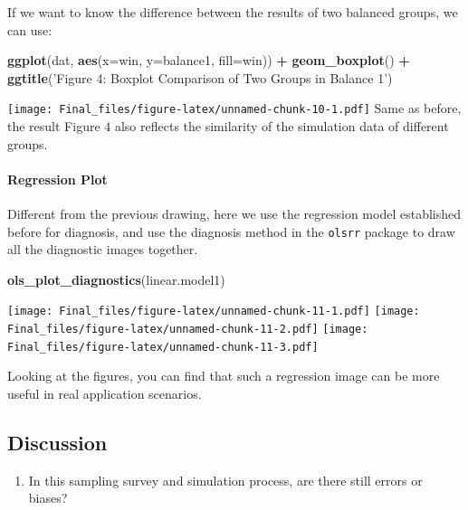 \documentclass[
]{article}
\newenvironment{Shaded}{\begin{snugshade}}{\end{snugshade}}
\newcommand{\DataTypeTok}[1]{\textcolor[rgb]{0.13,0.29,0.53}{#1}}
\newcommand{\KeywordTok}[1]{\textcolor[rgb]{0.13,0.29,0.53}{\textbf{#1}}}
\newcommand{\NormalTok}[1]{#1}
\newcommand{\OperatorTok}[1]{\textcolor[rgb]{0.81,0.36,0.00}{\textbf{#1}}}
\newcommand{\StringTok}[1]{\textcolor[rgb]{0.31,0.60,0.02}{#1}}
\providecommand{\tightlist}{%
  \setlength{\itemsep}{0pt}\setlength{\parskip}{0pt}}
\begin{document}
If we want to know the difference between the results of two balanced
groups, we can use:

\begin{Shaded}
\begin{Highlighting}[]
\KeywordTok{ggplot}\NormalTok{(dat, }\KeywordTok{aes}\NormalTok{(}\DataTypeTok{x=}\NormalTok{win, }\DataTypeTok{y=}\NormalTok{balance1, }\DataTypeTok{fill=}\NormalTok{win)) }\OperatorTok{+}
\StringTok{  }\KeywordTok{geom_boxplot}\NormalTok{() }\OperatorTok{+}
\StringTok{  }\KeywordTok{ggtitle}\NormalTok{(}\StringTok{'Figure 4: Boxplot Comparison of Two Groups in Balance 1'}\NormalTok{)}
\end{Highlighting}
\end{Shaded}

\texttt{[image: Final\_files/figure-latex/unnamed-chunk-10-1.pdf]} Same
as before, the result Figure 4 also reflects the similarity of the
simulation data of different groups.

\hypertarget{regression-plot}{%
\paragraph{Regression Plot}\label{regression-plot}}

Different from the previous drawing, here we use the regression model
established before for diagnosis, and use the diagnosis method in the
\texttt{olsrr} package to draw all the diagnostic images together.

\begin{Shaded}
\begin{Highlighting}[]
\KeywordTok{ols_plot_diagnostics}\NormalTok{(linear.model1)}
\end{Highlighting}
\end{Shaded}

\texttt{[image: Final\_files/figure-latex/unnamed-chunk-11-1.pdf]}
\texttt{[image: Final\_files/figure-latex/unnamed-chunk-11-2.pdf]}
\texttt{[image: Final\_files/figure-latex/unnamed-chunk-11-3.pdf]}

Looking at the figures, you can find that such a regression image can be
more useful in real application scenarios.

\hypertarget{discussion}{%
\subsection{Discussion}\label{discussion}}

\begin{enumerate}
\def\labelenumi{\arabic{enumi}.}
\tightlist
\item
  In this sampling survey and simulation process, are there still errors
  or biases?
\end{enumerate}
\end{document}
